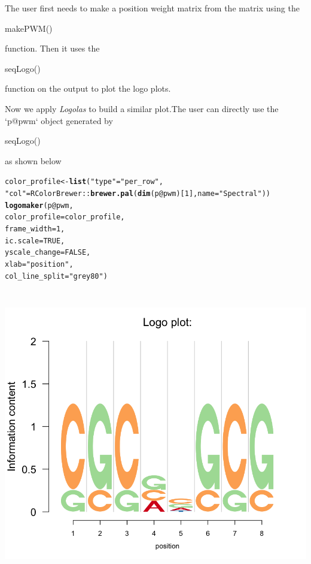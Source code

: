 \documentclass[12pt]{article}\usepackage[]{graphicx}\usepackage[usenames,dvipsnames]{color}
\makeatletter
\newcommand{\hlnum}[1]{\textcolor[rgb]{0.686,0.059,0.569}{#1}}%
\newcommand{\hlstr}[1]{\textcolor[rgb]{0.192,0.494,0.8}{#1}}%
\newcommand{\hlopt}[1]{\textcolor[rgb]{0,0,0}{#1}}%
\newcommand{\hlstd}[1]{\textcolor[rgb]{0.345,0.345,0.345}{#1}}%
\newcommand{\hlkwb}[1]{\textcolor[rgb]{0.69,0.353,0.396}{#1}}%
\newcommand{\hlkwc}[1]{\textcolor[rgb]{0.333,0.667,0.333}{#1}}%
\newcommand{\hlkwd}[1]{\textcolor[rgb]{0.737,0.353,0.396}{\textbf{#1}}}%
\newenvironment{kframe}{%
 \def\at@end@of@kframe{}%
 \ifinner\ifhmode%
  \def\at@end@of@kframe{\end{minipage}}%
  \begin{minipage}{\columnwidth}%
 \fi\fi%
 \def\FrameCommand##1{\hskip\@totalleftmargin \hskip-\fboxsep
 \colorbox{shadecolor}{##1}\hskip-\fboxsep
     \hskip-\linewidth \hskip-\@totalleftmargin \hskip\columnwidth}%
 \MakeFramed {\advance\hsize-\width
   \@totalleftmargin\z@ \linewidth\hsize
   \@setminipage}}%
 {\par\unskip\endMakeFramed%
 \at@end@of@kframe}
\newenvironment{knitrout}{}{} %
\newcommand{\Logolas}{\textit{Logolas}}
\makeatother
\begin{document}
The user first needs to make a position weight matrix from the matrix using the \begin{verb} makePWM() \end{verb} function. Then it uses the \begin{verb} seqLogo() \end{verb} function on the output to plot the logo plots.

\newpage

Now we apply \Logolas{} to build a similar plot.The user can directly use the `p@pwm` object generated by \begin{verb} seqLogo() \end{verb} as shown below

\begin{knitrout}
\color{fgcolor}\begin{kframe}
\begin{alltt}
\hlstd{color_profile} \hlkwb{<-} \hlkwd{list}\hlstd{(}\hlstr{"type"} \hlstd{=} \hlstr{"per_row"}\hlstd{,}
                      \hlstr{"col"} \hlstd{= RColorBrewer}\hlopt{::}\hlkwd{brewer.pal}\hlstd{(}\hlkwd{dim}\hlstd{(p}\hlopt{@}\hlkwc{pwm}\hlstd{)[}\hlnum{1}\hlstd{],}\hlkwc{name} \hlstd{=}\hlstr{"Spectral"}\hlstd{))}
\hlkwd{logomaker}\hlstd{(p}\hlopt{@}\hlkwc{pwm}\hlstd{,}
          \hlkwc{color_profile} \hlstd{= color_profile,}
          \hlkwc{frame_width} \hlstd{=} \hlnum{1}\hlstd{,}
          \hlkwc{ic.scale} \hlstd{=} \hlnum{TRUE}\hlstd{,}
          \hlkwc{yscale_change}\hlstd{=}\hlnum{FALSE}\hlstd{,}
          \hlkwc{xlab}\hlstd{=}\hlstr{"position"}\hlstd{,}
          \hlkwc{col_line_split} \hlstd{=} \hlstr{"grey80"}\hlstd{)}
\end{alltt}
\end{kframe}
\includegraphics[width=6in,height=5in]{figure/logolas_use_0-1} 

\end{knitrout}
\end{document}

